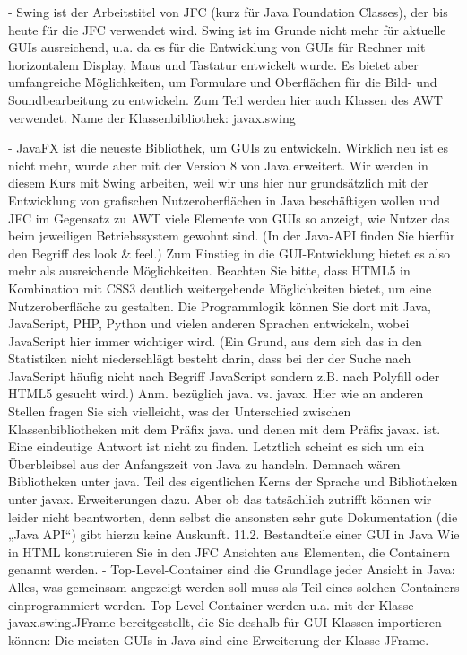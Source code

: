 -	Swing ist der Arbeitstitel von JFC (kurz für Java Foundation Classes), der bis heute für die JFC verwendet wird. Swing ist im Grunde nicht mehr für aktuelle GUIs ausreichend, u.a. da es für die Entwicklung von GUIs für Rechner mit horizontalem Display, Maus und Tastatur entwickelt wurde. Es bietet aber umfangreiche Möglichkeiten, um Formulare und Oberflächen für die Bild- und Soundbearbeitung zu entwickeln. Zum Teil werden hier auch Klassen des AWT verwendet. Name der Klassenbibliothek: javax.swing

-	JavaFX ist die neueste Bibliothek, um GUIs zu entwickeln. Wirklich neu ist es nicht mehr, wurde aber mit der Version 8 von Java erweitert.
Wir werden in diesem Kurs mit Swing arbeiten, weil wir uns hier nur grundsätzlich mit der Entwicklung von grafischen Nutzeroberflächen in Java beschäftigen wollen und JFC im Gegensatz zu AWT viele Elemente von GUIs so anzeigt, wie Nutzer das beim jeweiligen Betriebssystem gewohnt sind. (In der Java-API finden Sie hierfür den Begriff des look \& feel.) Zum Einstieg in die GUI-Entwicklung bietet es also mehr als ausreichende Möglichkeiten.
Beachten Sie bitte, dass HTML5 in Kombination mit CSS3 deutlich weitergehende Möglichkeiten bietet, um eine Nutzeroberfläche zu gestalten. Die Programmlogik können Sie dort mit Java, JavaScript, PHP, Python und vielen anderen Sprachen entwickeln, wobei JavaScript hier immer wichtiger wird. (Ein Grund, aus dem sich das in den Statistiken nicht niederschlägt besteht darin, dass bei der der Suche nach JavaScript häufig nicht nach Begriff JavaScript sondern z.B. nach Polyfill oder HTML5 gesucht wird.)
Anm. bezüglich java. vs. javax.
Hier wie an anderen Stellen fragen Sie sich vielleicht, was der Unterschied zwischen Klassenbibliotheken mit dem Präfix java. und denen mit dem Präfix javax. ist. Eine eindeutige Antwort ist nicht zu finden. Letztlich scheint es sich um ein Überbleibsel aus der Anfangszeit von Java zu handeln. Demnach wären Bibliotheken unter java. Teil des eigentlichen Kerns der Sprache und Bibliotheken unter javax. Erweiterungen dazu. Aber ob das tatsächlich zutrifft können wir leider nicht beantworten, denn selbst die ansonsten sehr gute Dokumentation (die „Java API“) gibt hierzu keine Auskunft.
11.2.	Bestandteile einer GUI in Java
Wie in HTML konstruieren Sie in den JFC Ansichten aus Elementen, die Containern genannt werden.
-	Top-Level-Container sind die Grundlage jeder Ansicht in Java: Alles, was gemeinsam angezeigt werden soll muss als Teil eines solchen Containers einprogrammiert werden. Top-Level-Container werden u.a. mit der Klasse javax.swing.JFrame bereitgestellt, die Sie deshalb für GUI-Klassen importieren können: Die meisten GUIs in Java sind eine Erweiterung der Klasse JFrame.

